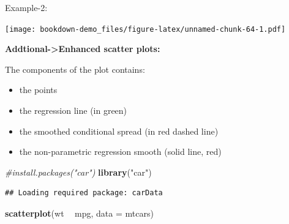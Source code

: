\documentclass[]{book}
\newenvironment{Shaded}{\begin{snugshade}}{\end{snugshade}}
\newcommand{\KeywordTok}[1]{\textcolor[rgb]{0.13,0.29,0.53}{\textbf{#1}}}
\newcommand{\DataTypeTok}[1]{\textcolor[rgb]{0.13,0.29,0.53}{#1}}
\newcommand{\DecValTok}[1]{\textcolor[rgb]{0.00,0.00,0.81}{#1}}
\newcommand{\StringTok}[1]{\textcolor[rgb]{0.31,0.60,0.02}{#1}}
\newcommand{\CommentTok}[1]{\textcolor[rgb]{0.56,0.35,0.01}{\textit{#1}}}
\newcommand{\OtherTok}[1]{\textcolor[rgb]{0.56,0.35,0.01}{#1}}
\newcommand{\OperatorTok}[1]{\textcolor[rgb]{0.81,0.36,0.00}{\textbf{#1}}}
\newcommand{\NormalTok}[1]{#1}
\providecommand{\tightlist}{%
  \setlength{\itemsep}{0pt}\setlength{\parskip}{0pt}}
\begin{document}
Example-2:

\begin{Shaded}
\end{Shaded}

\texttt{[image: bookdown-demo\_files/figure-latex/unnamed-chunk-64-1.pdf]}

\textbf{Addtional-\textgreater{}Enhanced scatter plots:}

The components of the plot contains:

\begin{itemize}
\tightlist
\item
  the points
\item
  the regression line (in green)
\item
  the smoothed conditional spread (in red dashed line)
\item
  the non-parametric regression smooth (solid line, red)
\end{itemize}

\begin{Shaded}
\begin{Highlighting}[]
\CommentTok{#install.packages("car")}
\KeywordTok{library}\NormalTok{(}\StringTok{"car"}\NormalTok{)}
\end{Highlighting}
\end{Shaded}

\begin{verbatim}
## Loading required package: carData
\end{verbatim}

\begin{Shaded}
\begin{Highlighting}[]
\KeywordTok{scatterplot}\NormalTok{(wt }\OperatorTok{~}\StringTok{ }\NormalTok{mpg, }\DataTypeTok{data =}\NormalTok{ mtcars)}
\end{Highlighting}
\end{Shaded}
\end{document}

